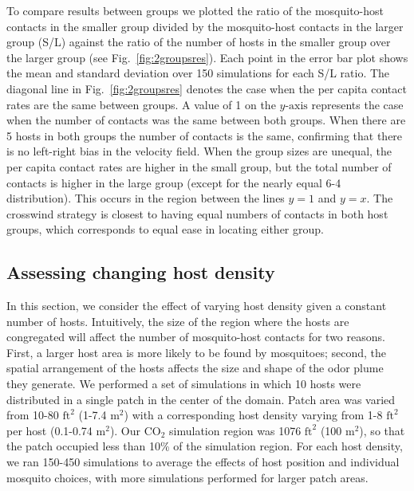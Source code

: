 \documentclass[10pt]{article}
\begin{document}
To compare results between groups we plotted
the ratio of the mosquito-host contacts in the smaller group divided by the mosquito-host contacts in the larger group (S/L) against the ratio of the number of hosts in the smaller group over the larger group
(see Fig.~\ref{fig:2groupsres}). Each point in the error bar plot shows the mean and standard deviation over 150 simulations for each S/L ratio. The diagonal line in Fig.~\ref{fig:2groupsres} denotes the case when the per capita contact rates are the same between groups. A value of 1 on the $y\mbox{-axis}$ represents the case when the number of contacts was the same between both groups. When there are 5 hosts in both groups the number of contacts is the same, confirming that there is no left-right bias in the velocity field. When the group sizes are unequal, the per capita contact rates are higher in the small group, but the total number of contacts is higher in the large group (except for the nearly equal 6-4 distribution). This occurs in the region between the lines $y=1$ and $y=x$. The crosswind strategy is closest to having equal numbers of contacts in both host groups, which corresponds to equal ease in locating either group.  

\subsection*{Assessing changing host density}\label{sec:res:hostdens}
In this section, we consider the effect of varying host density given a constant number of hosts.  Intuitively, the size of the region where the hosts are congregated will affect the number of mosquito-host contacts for two reasons.  First, a larger host area is more likely to be found by mosquitoes; second, the spatial arrangement of the hosts affects the size and shape of the odor plume they generate. 
%
We performed a set of simulations in which 10 hosts were distributed in a single patch in the center of the domain. Patch area was varied from 10-80 $\mbox{ft}^2$ (1-7.4 $\mbox{m}^2$) with a corresponding host density varying from 1-8 $\mbox{ft}^2$ per host (0.1-0.74 $\mbox{m}^2$). Our $\mbox{CO}_2$ simulation region was 1076 $\mbox{ft}^2$ (100 $\mbox{m}^2$), so that the patch occupied less than 10\% of the simulation region. For each host density, we ran 150-450 simulations to average the effects of host position and individual mosquito choices, with more simulations performed for larger patch areas.
\end{document}
